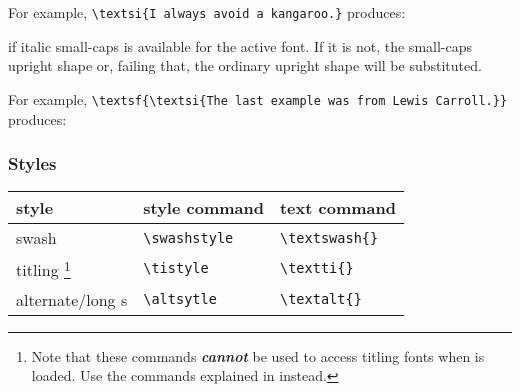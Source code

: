 \documentclass[11pt,british]{article}
\begin{document}
	For example, \verb|\textsi{I always avoid a kangaroo.}| produces:
		\begin{center}
		\end{center}
	if italic small-caps is available for the active font. If it is not, the small-caps upright shape or, failing that, the ordinary upright shape will be substituted.
	
	For example, \verb|\textsf{\textsi{The last example was from Lewis Carroll.}}| produces:
		\begin{center}
			\textsf{}
		\end{center}
		
\subsubsection{Styles}\label{sec:styles}

	\begin{longtable}{lll}
		\toprule
		\textbf{style}			&	\textbf{style command}	&	\textbf{text command}\\\midrule\endhead
		\bottomrule\endfoot
		swash							&	\verb|\swashstyle|				&	\verb|\textswash{}|\\
		titling%
			\footnote{Note that these commands \emph{\textbf{cannot}} be used to access titling fonts when \lpack{venturis2} is loaded. Use the commands explained in \fref{sec:titling} instead.}%
											&	\verb|\tistyle|						&	\verb|\textti{}|\\
		alternate/long s		&	\verb|\altsytle|					&	\verb|\textalt{}|\\
	\end{longtable}
	
\end{document}
